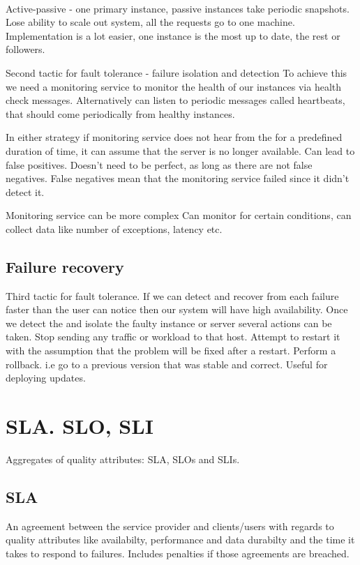 \paragraph{}
Active-passive - one primary instance, passive instances take periodic snapshots.
Lose ability to scale out system, all the requests go to one machine.
Implementation is a lot easier, one instance is the most up to date, the rest or followers.

Second tactic for fault tolerance - failure isolation and detection
To achieve this we need a monitoring service to monitor the health of our instances via health check messages.
Alternatively can listen to periodic messages called heartbeats, that should come periodically from healthy instances.

In either strategy if monitoring service does not hear from the for a predefined duration of time, it can assume that the server is no longer available.
Can lead to false positives.
Doesn't need to be perfect, as long as there are not false negatives.
False negatives mean that the monitoring service failed since it didn't detect it.

Monitoring service can be more complex
Can monitor for certain conditions, can collect data like number of exceptions, latency etc.

\subsection{Failure recovery}
Third tactic for fault tolerance.
If we can detect and recover from each failure faster than the user can notice then our system will have high availability.
Once we detect the and isolate the faulty instance or server several actions can be taken.
Stop sending any traffic or workload to that host.
Attempt to restart it with the assumption that the problem will be fixed after a restart.
Perform a rollback.
i.e go to a previous version that was stable and correct. Useful for deploying updates.


\section{SLA. SLO, SLI}
Aggregates of quality attributes: SLA, SLOs and SLIs.

\subsection{SLA}
An agreement between the service provider and clients/users with regards to quality attributes like availabilty, performance and data durabilty and the time it takes to respond to failures.
Includes penalties if those agreements are breached.

